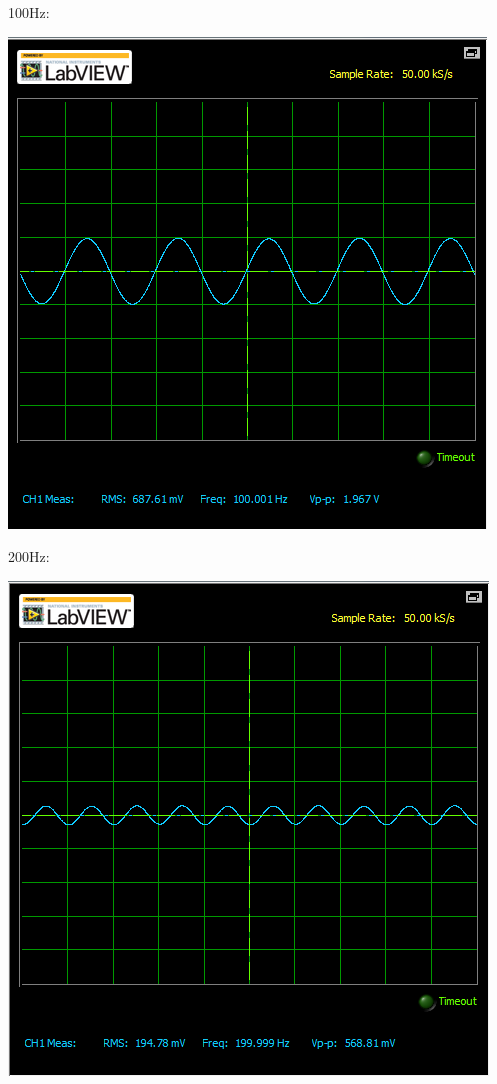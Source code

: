 \documentclass[12pt,letterpaper,boxed]{hmcpset}
\begin{document}
\newpage
100Hz:
\begin{center}
\includegraphics[scale=.8]{100Hz}
\end{center}
200Hz:
\begin{center}
\includegraphics[scale=.8]{200Hz}
\end{center}
\end{document}
